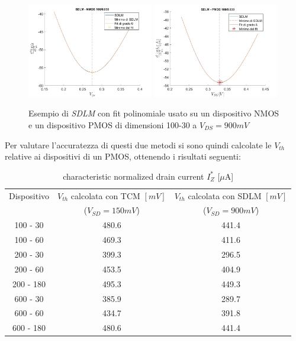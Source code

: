 \documentclass[12pt, letterpaper]{book}
\begin{document}
\begin{figure}[h!]
\centering
 \includegraphics[width=0.49\textwidth]{SDLM-N4-100-30}
 \includegraphics[width=0.49\textwidth]{SDLM-P1-100-30}
 \caption{Esempio di \emph{SDLM} con fit polinomiale usato su un dispositivo NMOS e un dispositivo PMOS di dimensioni 100-30 a $V_{DS} = 900 mV$}
\end{figure}

Per valutare l'accuratezza di questi due metodi si sono quindi calcolate le $V_{th}$ relative ai dispositivi di un PMOS, ottenendo i risultati seguenti:

\begin{table}[h!] 
\renewcommand{\arraystretch}{1.3}
\caption{characteristic normalized drain current $I^{*}_{Z}$ [$\mu$A]}
\label{tab:Iz*} 
\begin{center}
\begin{tabular}{ c  c  c }
\hline
Dispositivo &  $V_{th}$  calcolata con TCM $[mV]$  & $V_{th}$  calcolata con SDLM $[mV]$ \\
 & ($V_{SD} = 150 mV$) & ($V_{SD} = 900 mV$) \\
\hline
100 - 30  & 480.6 & 441.4 \\
\hline
100 - 60  & 469.3 & 411.6 \\
\hline
200 - 30  & 399.3 & 296.5 \\
\hline
200 - 60  & 453.5 & 404.9 \\
\hline
200 - 180 & 495.3 & 449.3 \\
\hline
600 - 30 & 385.9 & 289.7 \\
\hline
600 - 60 & 434.7 & 391.8 \\
\hline
600 - 180 & 480.6 & 441.4 \\
\hline

\end{tabular}
\end{center}
\end{table} 
\end{document}
